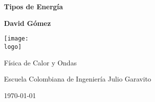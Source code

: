 \documentclass{article}
\newcommand{\logo}{"logo-eci-invert.png"}
\newcommand{\titlename}{Tipos de Energía}
\renewcommand{\author}{{David Gómez}}
\begin{document}
\begin{titlepage}
    \begin{center}
        \vspace{1cm}

        \textbf{\Huge{\titlename}}

        \vspace{1.5cm}

        \textbf{\large{\author}}

        \vspace{3cm}

        \texttt{[image: \\logo]}
        
        \vfill

        Física de Calor y Ondas

        Escuela Colombiana de Ingeniería Julio Garavito

        \today
    \end{center}
\end{titlepage}

\clearpage
\tableofcontents




\end{document}

